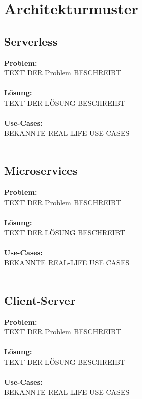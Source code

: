 \documentclass[../main.tex]{subfiles}
\begin{document}
	
	\section{Architekturmuster}
	
	\subsection{Serverless}
	\textbf{Problem:}\\
	TEXT DER Problem BESCHREIBT\\\\
	\textbf{Lösung:}\\
	TEXT DER LÖSUNG BESCHREIBT\\\\
	\textbf{Use-Cases:}\\
	BEKANNTE REAL-LIFE USE CASES\\\\
	\clearpage
	
	\subsection{Microservices}
	\textbf{Problem:}\\
	TEXT DER Problem BESCHREIBT\\\\
	\textbf{Lösung:}\\
	TEXT DER LÖSUNG BESCHREIBT\\\\
	\textbf{Use-Cases:}\\
	BEKANNTE REAL-LIFE USE CASES\\\\
	\clearpage
	
	\subsection{Client-Server}
	\textbf{Problem:}\\
	TEXT DER Problem BESCHREIBT\\\\
	\textbf{Lösung:}\\
	TEXT DER LÖSUNG BESCHREIBT\\\\
	\textbf{Use-Cases:}\\
	BEKANNTE REAL-LIFE USE CASES\\\\
	\clearpage	
	
\end{document}

